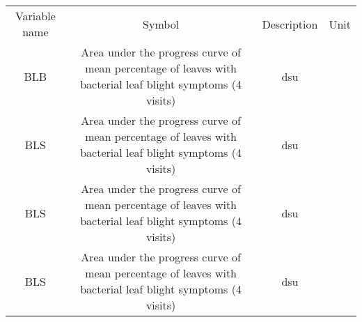 \begin{table} 
    \begin{tabular}{ c c c c}
        Variable name & Symbol & Description & Unit\\ 
        BLB & Area under the progress curve of mean percentage of leaves with bacterial leaf blight symptoms (4 visits) & dsu & \\ 
        BLS & Area under the progress curve of mean percentage of leaves with bacterial leaf blight symptoms (4 visits) & dsu & \\ 
        BLS & Area under the progress curve of mean percentage of leaves with bacterial leaf blight symptoms (4 visits) & dsu & \\  
        BLS & Area under the progress curve of mean percentage of leaves with bacterial leaf blight symptoms (4 visits) & dsu & \\ 
    \end{tabular} 
\end{table}